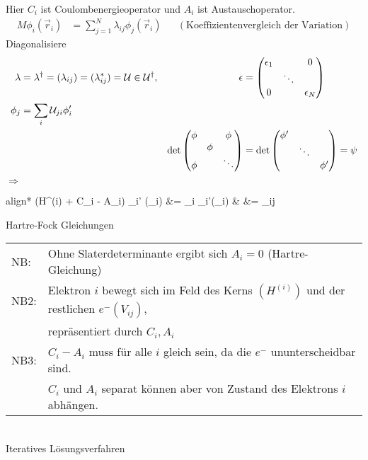 Hier $C_i$ ist Coulombenergieoperator und $A_i$ ist Austauschoperator.
	\begin{align*}
		M \phi_i (\vec{r}_i) &= \sum_{j=1}^{N} \lambda_{ij} \phi_j (\vec{r}_i)
		& &(\text{Koeffizientenvergleich der Variation})
	\end{align*}
Diagonalisiere
	\begin{align*}
		\lambda &= \lambda^\dagger = (\lambda_{ij}) = (\lambda_{ij}^*) 
		= \mathcal{U} \in \mathcal{U}^\dagger 
		,& \epsilon &=
		\begin{pmatrix}
			\epsilon_1 & & 0 \\
			 & \ddots &  \\
			 0 &  & \epsilon_N
		\end{pmatrix} \\
		\phi_j &= \sum_i \mathcal{U}_{ji} \phi_i' \\
		& & \det
		\begin{pmatrix}
			\phi &  & \phi \\
			& \phi & \\
			\phi & & \ddots
		\end{pmatrix}
		&= \det
		\begin{pmatrix}
			\phi' & & \\
			& \ddots & \\
			& & \phi'
		\end{pmatrix} = \psi
	\end{align*}
	$\Rightarrow$
	\begin{empheq}[box = \boxed]{align*}
		(H^{(i)} + C_i - A_i) \phi_i' (_i) &= \epsilon_i \phi_i'(_i)
		&  &= \delta_{ij}
	\end{empheq}
Hartre-Fock Gleichungen

	\begin{tabular}{l l}
		NB: & Ohne Slaterdeterminante ergibt sich $A_i = 0$ (Hartre-Gleichung) \\
		NB2: & Elektron $i$ bewegt sich im Feld des Kerns $(H^{(i)})$ und der restlichen $e^- (V_{ij})$, \\
		 & repräsentiert durch $C_i, A_i$ \\
		NB3: & $C_i - A_i$ muss für alle $i$ gleich sein, da die $e^-$ ununterscheidbar sind. \\
		 & $C_i$ und $A_i$ separat können aber von Zustand des Elektrons $i$ abhängen. \hfill \\
	\end{tabular} \\
		
Iteratives Lösungsverfahren

